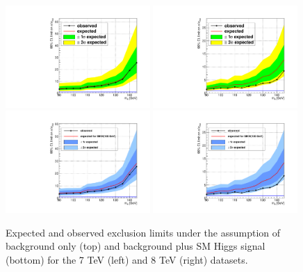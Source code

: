 \begin{figure}
\begin{center}
  \includegraphics[width=0.49\textwidth]{4_Analisys/pics/limits/vhtt_wh/vhtt_wh_7TeV.pdf}
  \includegraphics[width=0.49\textwidth]{4_Analisys/pics/limits/vhtt_wh/vhtt_wh_8TeV.pdf}\\
  \includegraphics[width=0.49\textwidth]{4_Analisys/pics/limits/vhtt_wh/vhtt_wh_injected_7TeV.pdf}
  \includegraphics[width=0.49\textwidth]{4_Analisys/pics/limits/vhtt_wh/vhtt_wh_injected_8TeV.pdf}\\
  \caption{Expected and observed exclusion limits under the assumption of background only (top) and background plus SM Higgs signal (bottom) for the 7 TeV (left) and 8 TeV (right) datasets.}
  \label{fig:llt_limits_78TeV}
\end{center}
\end{figure}

